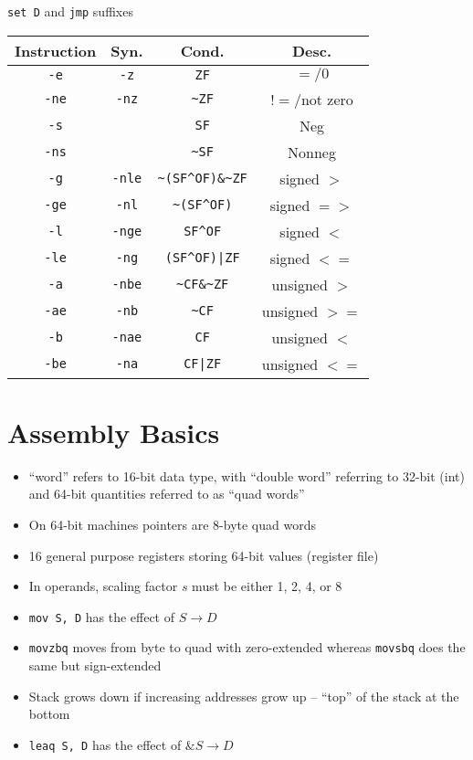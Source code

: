\documentclass[twocolumn]{article}
\renewcommand{\tt}[1]{\texttt{#1}}
\begin{document}
\tt{set D} and \tt{jmp} suffixes \\
\begin{tabular}{| c || c | c | c |}
    \hline
    \textbf{Instruction} & \textbf{Syn.} & \textbf{Cond.} & \textbf{Desc.} \\ \hline
    \tt{-e} & \tt{-z} & \verb|ZF| & $=/0$ \\ \hline
    \tt{-ne} & \tt{-nz} & \verb|~ZF| & $!=$/not zero \\ \hline
    \tt{-s} &  & \verb|SF| & Neg \\ \hline
    \tt{-ns} &  & \verb|~SF| & Nonneg \\ \hline
    \tt{-g} & \tt{-nle} & \verb|~(SF^OF)&~ZF| & signed $>$ \\ \hline
    \tt{-ge} & \tt{-nl} & \verb|~(SF^OF)| & signed $=>$ \\ \hline
    \tt{-l} & \tt{-nge} & \verb|SF^OF| & signed $<$ \\ \hline
    \tt{-le} & \tt{-ng} & \verb=(SF^OF)|ZF= & signed $<=$ \\ \hline
    \tt{-a} & \tt{-nbe} & \verb|~CF&~ZF| & unsigned $>$ \\ \hline
    \tt{-ae} & \tt{-nb} & \verb|~CF| & unsigned $>=$ \\ \hline
    \tt{-b} & \tt{-nae} & \verb|CF| & unsigned $<$ \\ \hline
    \tt{-be} & \tt{-na} & \verb=CF|ZF= & unsigned $<=$ \\ \hline
\end{tabular}

\vfill
\pagebreak

\section{Assembly Basics}
\begin{itemize}[noitemsep]
    \item ``word'' refers to 16-bit data type, with ``double word'' referring to 32-bit (int) and 64-bit quantities referred to as ``quad words''
    \item On 64-bit machines pointers are 8-byte quad words
    \item 16 general purpose registers storing 64-bit values (register file)
    \item In operands, scaling factor $s$ must be either 1, 2, 4, or 8
    \item \tt{mov S, D} has the effect of $S \to D$
    \item \tt{movzbq} moves from byte to quad with zero-extended whereas \tt{movsbq} does the same but sign-extended
    \item Stack grows down if increasing addresses grow up -- ``top'' of the stack at the bottom
    \item \tt{leaq S, D} has the effect of $\&S \to D$
\end{itemize}
\end{document}
